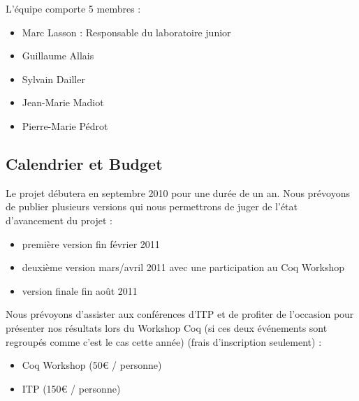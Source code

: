 \documentclass[11pt]{article}
\begin{document}
L'équipe comporte 5 membres :

\begin{itemize}
 \item Marc Lasson : Responsable du laboratoire junior
 \item Guillaume Allais
 \item Sylvain Dailler
 \item Jean-Marie Madiot
 \item Pierre-Marie Pédrot
\end{itemize}

\subsection{Calendrier et Budget}

Le projet débutera en septembre 2010 pour une durée de un an.
Nous prévoyons de publier plusieurs versions qui nous permettrons de juger de l'état d'avancement du projet : 
\begin{itemize}
\item première version fin février 2011
\item deuxième version mars/avril 2011 avec une participation au Coq Workshop
\item version finale fin août 2011
\end{itemize}

Nous prévoyons d'assister aux conférences d'ITP et de profiter de l'occasion pour présenter nos résultats lors du Workshop Coq (si ces deux événements sont regroupés comme c'est le cas cette année) (frais d'inscription seulement) :
\begin{itemize}
	\item Coq Workshop (50€ / personne)
	\item ITP (150€ / personne) 
\end{itemize}

\printbibliography
\end{document}
